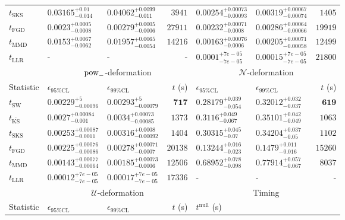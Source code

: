 \begin{tabular}{l|llr|llr}
	$t_{\mathrm{SKS}}$ & $0.03165_{-0.014}^{+0.01}$ & $0.04062_{-0.011}^{+0.0099}$ & $3941$ & $0.00254_{-0.00093}^{+0.00073}$ & $0.00319_{-0.00074}^{+0.00067}$ & $1405$ \\
	$t_{\mathrm{FGD}}$ & ${\mathbf{0.0023_{-0.0008}^{+0.0005}}}$ & ${\mathbf{0.00279_{-0.0006}^{+0.0005}}}$ & $27911$ & $0.00232_{-0.0008}^{+0.00071}$ & $0.00286_{-0.00066}^{+0.00064}$ & $19919$ \\
	$t_{\mathrm{MMD}}$ & $0.0153_{-0.0062}^{+0.0067}$ & $0.01957_{-0.0054}^{+0.0065}$ & $14216$ & ${\mathbf{0.00163_{-0.0006}^{+0.00076}}}$ & ${\mathbf{0.00205_{-0.00058}^{+0.00071}}}$ & $12499$ \\
	$t_{\mathrm{LLR}}$ & - & - & - & $0.0001_{-7e-05}^{+7e-05}$ & $0.00015_{-7e-05}^{+7e-05}$ & $21800$ \\
	\toprule
	\multicolumn{1}{c}{} & \multicolumn{3}{c}{$\rm{pow}_{-}$-deformation} & \multicolumn{3}{c}{$\mathcal{N}$-deformation} \\
	Statistic & $\epsilon_{95\%\mathrm{CL}}$ & $\epsilon_{99\%\mathrm{CL}}$ & $t$ (s) & $\epsilon_{95\%\mathrm{CL}}$ & $\epsilon_{99\%\mathrm{CL}}$ & $t$ (s) \\
	\midrule
	$t_{\mathrm{SW}}$ & $0.00229_{-0.00096}^{+5}$ & $0.00293_{-0.00079}^{+5}$ & ${\mathbf{717}}$ & $0.28179_{-0.054}^{+0.039}$ & $0.32012_{-0.037}^{+0.032}$ & ${\mathbf{619}}$ \\
	$t_{\overline{\mathrm{KS}}}$ & $0.0027_{-0.001}^{+0.00084}$ & $0.0034_{-0.00085}^{+0.00073}$ & $1373$ & $0.3116_{-0.067}^{+0.049}$ & $0.35101_{-0.049}^{+0.042}$ & $1063$ \\
	$t_{\mathrm{SKS}}$ & $0.00253_{-0.0011}^{+0.00087}$ & $0.00316_{-0.00092}^{+0.0008}$ & $1404$ & $0.30315_{-0.07}^{+0.045}$ & $0.34204_{-0.05}^{+0.037}$ & $1102$ \\
	$t_{\mathrm{FGD}}$ & $0.00225_{-0.00086}^{+0.00076}$ & $0.00278_{-0.0007}^{+0.00071}$ & $20138$ & ${\mathbf{0.13244_{-0.023}^{+0.016}}}$ & ${\mathbf{0.1479_{-0.016}^{+0.011}}}$ & $15260$ \\
	$t_{\mathrm{MMD}}$ & ${\mathbf{0.00143_{-0.00064}^{+0.00077}}}$ & ${\mathbf{0.00185_{-0.0006}^{+0.00073}}}$ & $12506$ & $0.68952_{-0.098}^{+0.078}$ & $0.77914_{-0.067}^{+0.057}$ & $8037$ \\
	$t_{\mathrm{LLR}}$ & $0.00012_{-7e-05}^{+7e-05}$ & $0.00017_{-7e-05}^{+7e-05}$ & $17336$ & - & - & - \\
	\toprule
	\multicolumn{1}{c}{} & \multicolumn{3}{c}{$\mathcal{U}$-deformation} & \multicolumn{3}{c}{Timing} \\
	Statistic & $\epsilon_{95\%\mathrm{CL}}$ & $\epsilon_{99\%\mathrm{CL}}$ & $t$ (s) & $t^{\mathrm{null}}$ (s) \\

\end{tabular}
